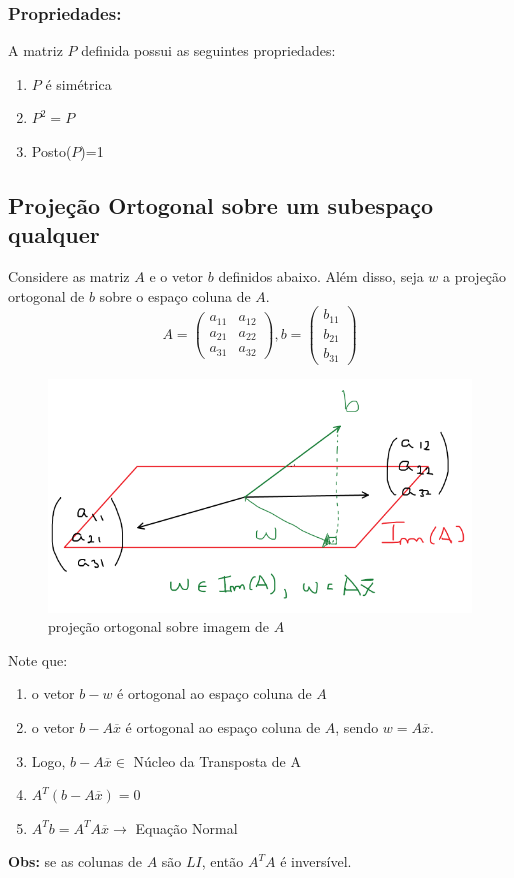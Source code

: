 \documentclass[12pt]{article}
\begin{document}
	\subsubsection{Propriedades:}
	
	A matriz $P$ definida possui as seguintes propriedades:
	\begin{enumerate}
		\item $P$ é simétrica
		\item $P^2=P$
		\item Posto($P$)=1
	\end{enumerate}
	
	\subsection{Projeção Ortogonal sobre um subespaço qualquer}
	Considere as matriz $A$ e o vetor $b$ definidos abaixo. Além disso, seja $w$ a projeção ortogonal de $b$ sobre o espaço coluna de $A$.
	\begin{equation*}
		A=\begin{pmatrix}
			a_{11} & a_{12} \\
			a_{21} & a_{22}\\
			a_{31} & a_{32} 
		\end{pmatrix},b=\begin{pmatrix}
			b_{11} \\
			b_{21} \\
			b_{31}
		\end{pmatrix}	
	\end{equation*}
	
	\begin{figure}[H]
		\centering
		\includegraphics[width=0.4\linewidth]{Imagens/projOrtogEsp}
		\caption{projeção ortogonal sobre imagem de $A$}
		\label{fig:projortogesp}
	\end{figure}
	
	
	Note que:
	\begin{enumerate}
		\item o vetor $b-w$ é ortogonal ao espaço coluna de $A$
		\item o vetor $b-A\overline{x}$ é ortogonal ao espaço coluna de $A$, sendo $w=A\overline{x}$.
		\item Logo, $b-A\overline{x}\in $ Núcleo da Transposta de A
		\item $A^T(b-A\overline{x})=0$
		\item $A^Tb=A^TA\overline{x} \rightarrow$ Equação Normal
	\end{enumerate}
	\textbf{Obs:} se as colunas de $A$ são $LI$, então $A^TA$ é inversível.
	
\end{document}
